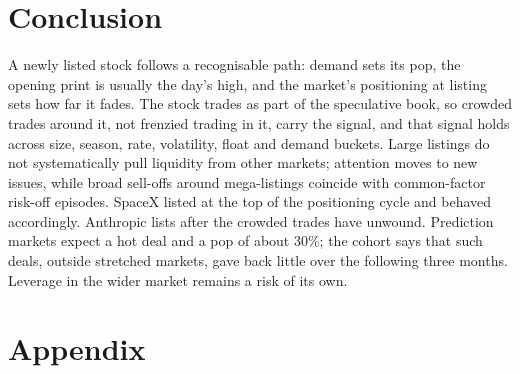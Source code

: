 \documentclass[11pt]{article}
\begin{document}
\section{Conclusion}
A newly listed stock follows a recognisable path: demand sets its pop, the opening print is usually the day's high, and the market's positioning at listing sets how far it fades. The stock trades as part of the speculative book, so crowded trades around it, not frenzied trading in it, carry the signal, and that signal holds across size, season, rate, volatility, float and demand buckets. Large listings do not systematically pull liquidity from other markets; attention moves to new issues, while broad sell-offs around mega-listings coincide with common-factor risk-off episodes. SpaceX listed at the top of the positioning cycle and behaved accordingly. Anthropic lists after the crowded trades have unwound. Prediction markets expect a hot deal and a pop of about 30\%; the cohort says that such deals, outside stretched markets, gave back little over the following three months. Leverage in the wider market remains a risk of its own.

\vspace{1em}




\clearpage
\appendix
\section{Appendix}





\end{document}
